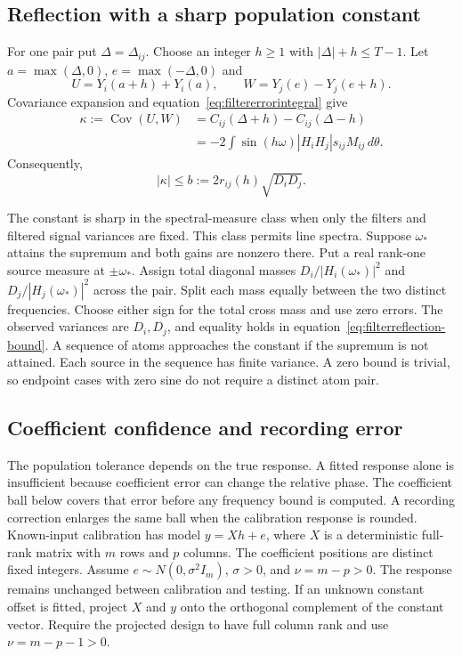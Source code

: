 \subsection{Reflection with a sharp population constant}

For one pair put $\Delta=\Delta_{ij}$. Choose an integer $h\ge1$ with
$|\Delta|+h\le T-1$. Let $a=\max(\Delta,0)$, $e=\max(-\Delta,0)$ and
\[
 U=Y_i(a+h)+Y_i(a),\qquad W=Y_j(e)-Y_j(e+h).
\]
Covariance expansion and equation~\eqref{eq:filtererrorintegral} give
\begin{align*}
 \kappa:=\operatorname{Cov}(U,W)
 &=C_{ij}(\Delta+h)-C_{ij}(\Delta-h)\\
 &=-2\int\sin(h\omega)|H_iH_j|s_{ij}M_{ij}\,d\theta.
\end{align*}
Consequently,
\begin{equation}\label{eq:filterreflection-bound}
 |\kappa|\le b:=2r_{ij}(h)\sqrt{D_iD_j}.
\end{equation}

The constant is sharp in the spectral-measure class when only the filters and filtered signal variances are fixed. This class permits line spectra. Suppose $\omega_*$ attains the supremum and both gains are nonzero
there. Put a real rank-one source measure at $\pm\omega_*$. Assign total
diagonal masses $D_i/|H_i(\omega_*)|^2$ and
$D_j/|H_j(\omega_*)|^2$ across the pair. Split each mass equally between
the two distinct frequencies. Choose either sign for the total cross mass and use zero errors.
The observed variances are $D_i,D_j$, and equality holds in
equation~\eqref{eq:filterreflection-bound}. A sequence of atoms approaches
the constant if the supremum is not attained. Each source in the sequence
has finite variance. A zero bound is trivial, so endpoint cases with zero
sine do not require a distinct atom pair.


\subsection{Coefficient confidence and recording error}\label{cal16:coefficients}
The population tolerance depends on the true response. A fitted response alone is insufficient because coefficient error can change the relative phase. The coefficient ball below covers that error before any frequency bound is computed. A recording correction enlarges the same ball when the calibration response is rounded.
Known-input calibration has model $y=Xh+e$, where $X$ is a deterministic full-rank matrix with $m$ rows and $p$ columns. The coefficient positions are distinct fixed integers. Assume $e\sim N(0,\sigma^2I_m)$, $\sigma>0$, and $\nu=m-p>0$. The response remains unchanged between calibration and testing. If an unknown constant offset is fitted, project $X$ and $y$ onto the orthogonal complement of the constant vector. Require the projected design to have full column rank and use $\nu=m-p-1>0$.

